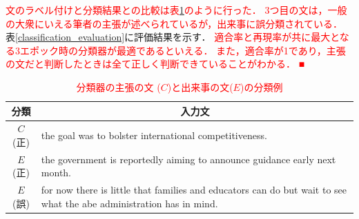 \documentclass[a4paper, twocolumn, 10pt]{jarticle}
\begin{document}
\textcolor{red}{
  文のラベル付けと分類結果との比較は表\ref{classification_example}のように行った．
  3つ目の文は，一般の大衆にいえる筆者の主張が述べられているが，出来事に誤分類されている．
}
表\ref{classification_evaluation}に評価結果を示す．
\textcolor{red}{
適合率と再現率が共に最大となる3エポック時の分類器が最適であるといえる．
また，適合率が1であり，主張の文だと判断したときは全て正しく判断できていることがわかる．
■
}

\begin{table}[H]
  \caption{\textcolor{red}{分類器の主張の文 ($C$)と出来事の文($E$)の分類例}}
  \centering
  {\tabcolsep=0.1cm
  \begin{tabular}{cp{6.5cm}}
      \hline
      分類 & \multicolumn{1}{c}{入力文}
      \\
      \hline
      $C$(正) & the goal was to bolster international competitiveness.
      \\
      $E$(正) & the government is reportedly aiming to announce guidance early next month.
      \\
      $E$(誤) & for now there is little that families and educators can do but wait to see what the abe administration has in mind.
      \\
      \hline
    \end{tabular}
    \label{classification_example}
    }
\end{table}
\end{document}
